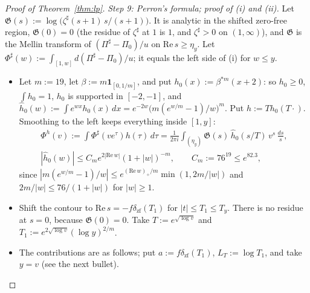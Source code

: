 \begin{proof}[Proof of Theorem~\ref{thm:lp}]
\emph{Step 9: Perron's formula; proof of (i) and (ii).} Let
$\mathfrak G(s):=\log\big(\zeta^\sharp(s+1)\,s/(s+1)\big)$. It is analytic in the shifted zero-free region, $\mathfrak G(0)=0$
(the residue of $\zeta^\sharp$ at $1$ is $1$, and $\zeta^\sharp>0$ on $(1,\infty)$), and $\mathfrak G$ is the Mellin transform of
$(\Pi^\sharp-\Pi_0)/u$ on $\mathrm{Re}\,s\ge\eta_y$. Let $\Phi^\sharp(w):=\int_{[1,w]}d(\Pi^\sharp-\Pi_0)/u$; it equals the left
side of (i) for $w\le y$.
\begin{itemize}
\item Let $m:=19$, let $\beta:=m\mathbf 1_{[0,1/m]}$, and put $h_0(x):=\beta^{*m}(x+2)$: so $h_0\ge0$, $\int h_0=1$, $h_0$ is supported in
  $[-2,-1]$, and $\hat h_0(w):=\int e^{wx}h_0(x)\,dx=e^{-2w}\big(m(e^{w/m}-1)/w\big)^m$. Put $h:=Th_0(T\cdot)$. Smoothing to the
  left keeps everything inside $[1,y]$:
  \begin{gather*}
    \Phi^h(v):=\int\Phi^\sharp(ve^\tau)h(\tau)\,d\tau=\frac1{2\pi i}\int_{(\eta_y)}\mathfrak G(s)\,\hat h_0(s/T)\,v^s\,\frac{ds}s,\\
    |\hat h_0(w)|\le C_me^{2|\mathrm{Re}\,w|}(1+|w|)^{-m},\qquad C_m:=76^{19}\le e^{82.3},
  \end{gather*}
  since $|m(e^{w/m}-1)/w|\le e^{(\mathrm{Re}\,w)_+/m}\min(1,2m/|w|)$ and $2m/|w|\le76/(1+|w|)$ for $|w|\ge1$.
\item Shift the contour to $\mathrm{Re}\,s=-f\delta_{\mathrm{zf}}(T_1)$ for $|t|\le T_1\le T_y$. There is no residue at $s=0$,
  because $\mathfrak G(0)=0$. Take $T:=e^{\sqrt{\log v}}$ and $T_1:=e^{2\sqrt{\log v}}(\log y)^{2/m}$.
\item The contributions are as follows; put $a:=f\delta_{\mathrm{zf}}(T_1)$, $L_T:=\log T_1$, and take $y=v$ (see the next bullet).
\end{itemize}
\end{proof}

